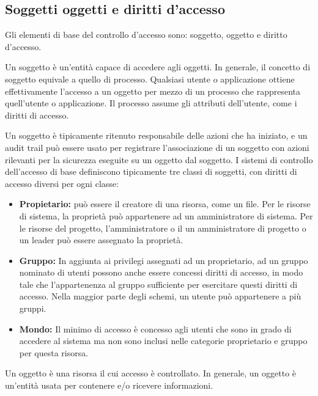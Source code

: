 \subsection{Soggetti oggetti e diritti d'accesso}
Gli elementi di base del controllo d'accesso sono: soggetto, oggetto e diritto d'accesso.

\singlespacing

Un soggetto è un'entità capace di accedere agli oggetti. In generale, il concetto di soggetto equivale a quello di processo. Qualsiasi utente o applicazione ottiene effettivamente l'accesso a un oggetto per mezzo di un processo che rappresenta quell'utente o applicazione. Il processo assume gli attributi dell'utente, come i diritti di accesso.

\singlespacing

Un soggetto è tipicamente ritenuto responsabile delle azioni che ha iniziato, e un audit trail può essere usato per registrare l'associazione di un soggetto con azioni rilevanti per la sicurezza eseguite su un oggetto dal soggetto.
I sistemi di controllo dell'accesso di base definiscono tipicamente tre classi di soggetti, con diritti di accesso diversi per ogni classe:
\begin{itemize}

    \item \textbf{Propietario:} può essere il creatore di una risorsa, come un file. Per le risorse di sistema, la proprietà può appartenere ad un amministratore di sistema. Per le risorse del progetto, l'amministratore o il un amministratore di progetto o un leader può essere assegnato la proprietà.
    
    \item \textbf{Gruppo:} In aggiunta ai privilegi assegnati ad un proprietario, ad un gruppo nominato di utenti possono anche essere concessi diritti di accesso, in modo tale che l'appartenenza al gruppo sufficiente per esercitare questi diritti di accesso. Nella maggior parte degli schemi, un utente può appartenere a più gruppi.
    
    \item \textbf{Mondo:} Il minimo di accesso è concesso agli utenti che sono in grado di accedere al sistema ma non sono inclusi nelle categorie proprietario e gruppo per questa risorsa.
    
\end{itemize}
Un oggetto è una risorsa il cui accesso è controllato. In generale, un oggetto è un'entità usata per contenere e/o ricevere informazioni.

